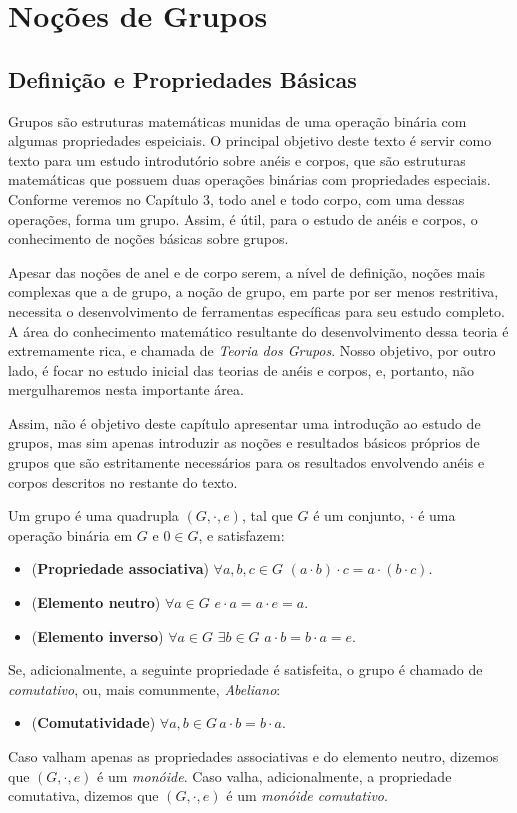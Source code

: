 \chapter{Noções de Grupos}


\section{Definição e Propriedades Básicas}

Grupos são estruturas matemáticas munidas de uma operação binária com algumas propriedades espeiciais.
O principal objetivo deste texto é servir como texto para um estudo introdutório sobre anéis e corpos, que são estruturas matemáticas que possuem duas operações binárias com propriedades especiais.
Conforme veremos no Capítulo 3, todo anel e todo corpo, com uma dessas operações, forma um grupo.
Assim, é útil, para o estudo de anéis e corpos, o conhecimento de noções básicas sobre grupos.

Apesar das noções de anel e de corpo serem, a nível de definição, noções mais complexas que a de grupo, a noção de grupo, em parte por ser menos restritiva, necessita o desenvolvimento de ferramentas específicas para seu estudo completo.
A área do conhecimento matemático resultante do desenvolvimento dessa teoria é extremamente rica, e chamada de \emph{Teoria dos Grupos}.
Nosso objetivo, por outro lado, é focar no estudo inicial das teorias de anéis e corpos, e, portanto, não mergulharemos nesta importante área.

Assim, não é objetivo deste capítulo apresentar uma introdução ao estudo de grupos, mas sim apenas introduzir as noções e resultados básicos próprios de grupos que são estritamente necessários para os resultados envolvendo anéis e corpos descritos no restante do texto.

\begin{definition}
Um grupo é uma quadrupla $(G,\cdot,e)$, tal que $G$ é um conjunto, $\cdot$ é uma operação binária em $G$ e $0 \in G$, e satisfazem:

\begin{itemize}
    \item (\textbf{Propriedade associativa}) $\forall a, b, c \in G$ $(a \cdot b) \cdot c = a \cdot (b \cdot c)$.
    \item (\textbf{Elemento neutro}) $\forall a \in G$  $e \cdot a = a \cdot e = a$.
    \item (\textbf{Elemento inverso}) $\forall a \in G$ $\exists b \in G$ $a \cdot b = b \cdot a = e$.
\end{itemize}
Se, adicionalmente, a seguinte propriedade é satisfeita, o grupo é chamado de \emph{comutativo}, ou, mais comunmente, \emph{Abeliano}:
\begin{itemize}
    \item (\textbf{Comutatividade}) $\forall a, b \in G\, a \cdot b = b \cdot a$.
\end{itemize}

Caso valham apenas as propriedades associativas e do elemento neutro, dizemos que $(G, \cdot, e)$ é um \emph{monóide}.
Caso valha, adicionalmente, a propriedade comutativa, dizemos que $(G, \cdot, e)$ é um \emph{monóide comutativo}.
\end{definition}

